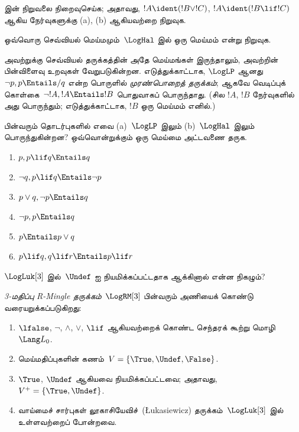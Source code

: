 \documentclass[../../../include/open-logic-section]{subfiles}
\begin{document}
\begin{prob}
   இன் நிறுவலை நிறைவுசெய்க; அதாவது,
  $!A \ident (!B \lor !C)$, $!A \ident (!B \lif !C)$ ஆகிய நேர்வுகளுக்கு
  (a), (b) ஆகியவற்றை நிறுவுக.
\end{prob}

\begin{prob}
ஒவ்வொரு செவ்வியல் மெய்மமும்~$\LogHal$ இல் ஒரு மெய்மம் என்று நிறுவுக.
\end{prob}

அவற்றுக்கு செவ்வியல் தருக்கத்தின் அதே மெய்மங்கள் இருந்தாலும், அவற்றின்
பின்விளைவு உறவுகள் வேறுபடுகின்றன. எடுத்துக்காட்டாக, $\LogLP$ ஆனது
$\lnot p, p \Entails/ q$ என்ற பொருளில் \emph{முரண்பொறைத் தருக்கம்}; ஆகவே
வெடிப்புக் கொள்கை~$\lnot !A, !A \Entails !B$ பொதுவாகப் பொருந்தாது.
(சில $!A$, $!B$ நேர்வுகளில் அது பொருந்தும்; எடுத்துக்காட்டாக, $!B$ ஒரு
மெய்மம் எனில்.)

\begin{prob}
  பின்வரும் தொடர்புகளில் எவை (a)~$\LogLP$ இலும் (b)~$\LogHal$ இலும்
  பொருந்துகின்றன? ஒவ்வொன்றுக்கும் ஒரு மெய்மை அட்டவணை தருக.
  \begin{enumerate}
    \item $p, p \lif q \Entails q$
    \item $\lnot q, p \lif q \Entails \lnot p$
    \item $p \lor q, \lnot p \Entails q$
    \item $\lnot p, p \Entails q$
    \item $p \Entails p \lor q$
    \item $p \lif q, q\lif r \Entails p \lif r$
  \end{enumerate}
\end{prob}

$\LogLuk[3]$ இல்~$\Undef$ ஐ நியமிக்கப்பட்டதாக ஆக்கினால் என்ன நிகழும்?

\begin{defn}
  \emph{3-மதிப்பு R-Mingle தருக்கம்}~$\LogRM[3]$ பின்வரும் அணியைக்
  கொண்டு வரையறுக்கப்படுகிறது:
  \begin{enumerate}
    \item $\lfalse$, $\lnot$, $\land$, $\lor$, $\lif$ ஆகியவற்றைக் கொண்ட
    செந்தரக் கூற்று மொழி~$\Lang L_0$.
    \item மெய்மதிப்புகளின் கணம்~$V = \{\True, \Undef, \False\}$.
    \item $\True$, $\Undef$ ஆகியவை நியமிக்கப்பட்டவை; அதாவது,
    $V^+ = \{\True, \Undef\}$.
    \item வாய்மைச் சார்புகள் லூகாசியேவிச்~(\L ukasiewicz)
    தருக்கம்~$\LogLuk[3]$ இல்
    உள்ளவற்றைப் போன்றவை.
  \end{enumerate}
\end{defn}
\end{document}
